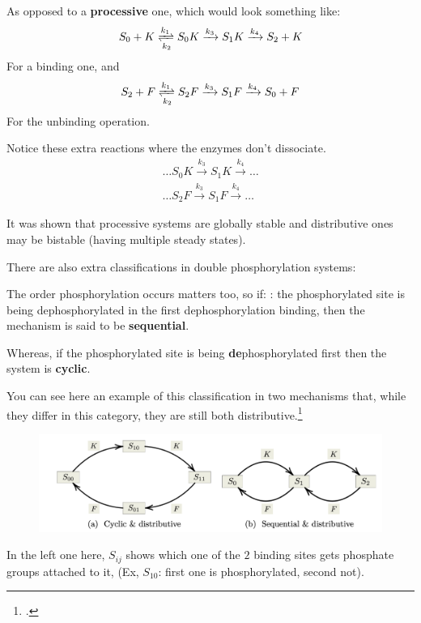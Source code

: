 As opposed to a \textbf{processive} one, which would look something like:
\begin{equation*}
	S_0 + K \xrightleftharpoons[k_2]{k_1} S_0 K \xrightarrow{k_3} S_1 K \xrightarrow{k_4} S_2 + K
\end{equation*}
For a binding one, and
\begin{equation*}
	S_2 + F \xrightleftharpoons[k_2]{k_1} S_2 F \xrightarrow{k_3} S_1 F \xrightarrow{k_4} S_0 + F
\end{equation*}
For the unbinding operation.

Notice these extra reactions where the enzymes don't dissociate.
\begin{gather*}
	\ldots S_0 K \xrightarrow{k_3} S_1 K \xrightarrow{k_4} \ldots \\
	\ldots S_2 F \xrightarrow{k_3} S_1 F \xrightarrow{k_4} \ldots	
\end{gather*}

It was shown that processive systems are globally stable and distributive ones may be bistable (having multiple steady states).

There are also extra classifications in double phosphorylation systems:

The order phosphorylation occurs matters too, so if:
: the  phosphorylated site is being dephosphorylated in the first dephosphorylation binding, then the mechanism is said to be \textbf{sequential}.

 Whereas, if the  phosphorylated site is being \textbf{de}phosphorylated first then the system is \textbf{cyclic}.

You can see here an example of this classification in two mechanisms that, while they differ in this category, they are still both distributive.\footcite{conradi2024}
\begin{figure}[H]	
	\includegraphics[width=13cm]{math_pics/cyclic-vs-sequential.png}\label{cyclic_vs_sequential_figure}
	\centering
\end{figure}
In the left one here, $S_{ij}$ shows which one of the $2$ binding sites gets phosphate groups attached to it, (Ex, $S_{10}$: first one is phosphorylated, second not).

